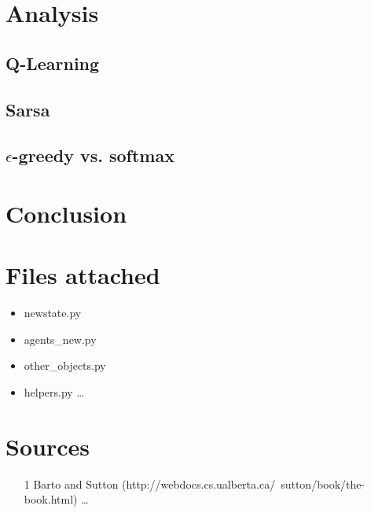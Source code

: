 \documentclass{article}
\begin{document}
\section*{Analysis}

\subsection*{Q-Learning}
\subsection*{Sarsa}
\subsection*{$\epsilon$-greedy vs. softmax}

\section*{Conclusion}

\section*{Files attached}
\begin{itemize}
\item newstate.py
\item agents\_new.py
\item other\_objects.py
\item helpers.py \ldots
\end{itemize}
\section*{Sources}



\begin{itemize}
	\item [1] Barto and Sutton (http://webdocs.cs.ualberta.ca/~sutton/book/the-book.html) \ldots
\end{itemize}
\end{document}
